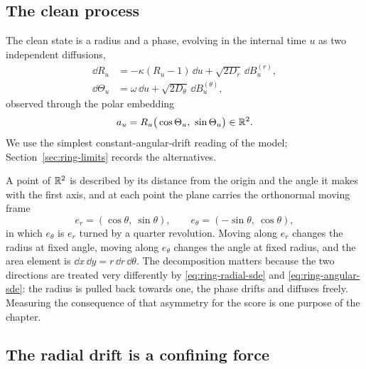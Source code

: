 \subsection{The clean process}

The clean state is a radius and a phase, evolving in the internal time $u$ as
two independent diffusions,
\begin{align}
  \dd R_u &= -\kappa (R_u - 1)\,\dd u + \sqrt{2 D_r}\, \dd B_u^{(r)} ,
  \label{eq:ring-radial-sde} \\
  \dd \Theta_u &= \omega\, \dd u + \sqrt{2 D_\theta}\, \dd B_u^{(\theta)} ,
  \label{eq:ring-angular-sde}
\end{align}
observed through the polar embedding
\begin{equation}
  a_u = R_u \big(\cos\Theta_u,\ \sin\Theta_u\big) \in \R^2 .
  \label{eq:ring-embedding}
\end{equation}
We use the simplest constant-angular-drift reading of the model;
Section~\ref{sec:ring-limits} records the alternatives.

A point of $\mathbb{R}^2$ is described by its distance from the origin and the angle it
makes with the first axis, and at each point the plane carries the orthonormal
moving frame
\begin{equation}
  e_r = (\cos\theta,\ \sin\theta), \qquad
  e_\theta = (-\sin\theta,\ \cos\theta) ,
  \label{eq:ring-moving-frame}
\end{equation}
in which $e_\theta$ is $e_r$ turned by a quarter revolution. Moving along $e_r$
changes the radius at fixed angle, moving along $e_\theta$ changes the angle at
fixed radius, and the area element is $\dd x\,\dd y = r\,\dd r\,\dd\theta$. The
decomposition matters because the two directions are treated very differently
by \eqref{eq:ring-radial-sde} and \eqref{eq:ring-angular-sde}: the radius is
pulled back towards one, the phase drifts and diffuses freely. Measuring the
consequence of that asymmetry for the score is one purpose of the chapter.

\subsection{The radial drift is a confining force}


